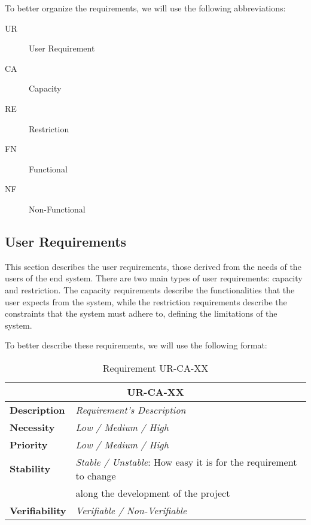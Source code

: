 To better organize the requirements, we will use the following abbreviations:

\begin{description}
    \item[UR]  User Requirement
    \item[CA]  Capacity
    \item[RE]  Restriction
    \item[FN]  Functional
    \item[NF]  Non-Functional
\end{description}

\subsection{User Requirements}
\label{sec:user-requirements}
This section describes the user requirements, those derived from the needs of the users of the end system. There are two main types of user requirements: capacity and restriction. The capacity requirements describe the functionalities that the user expects from the system, while the restriction requirements describe the constraints that the system must adhere to, defining the limitations of the system.

To better describe these requirements, we will use the following format:

\begin{table}[H]
    \centering
    \begin{tabular}{l p{10cm}}
        \toprule
        \multicolumn{2}{c}{UR-CA-XX} \\
        \toprule
        \textbf{Description}        & \textit{Requirement's Description} \\
        \textbf{Necessity}          & \textit{Low / Medium / High} \\
        \textbf{Priority}           & \textit{Low / Medium / High} \\
        \multirow{1}{*}{\textbf{Stability}} & \textit{Stable / Unstable}: How easy it is for the requirement to change \\ 
                                            & along the development of the project \\
        \textbf{Verifiability}       & \textit{Verifiable / Non-Verifiable} \\
    \end{tabular}
    \caption{Requirement UR-CA-XX}
\end{table}

